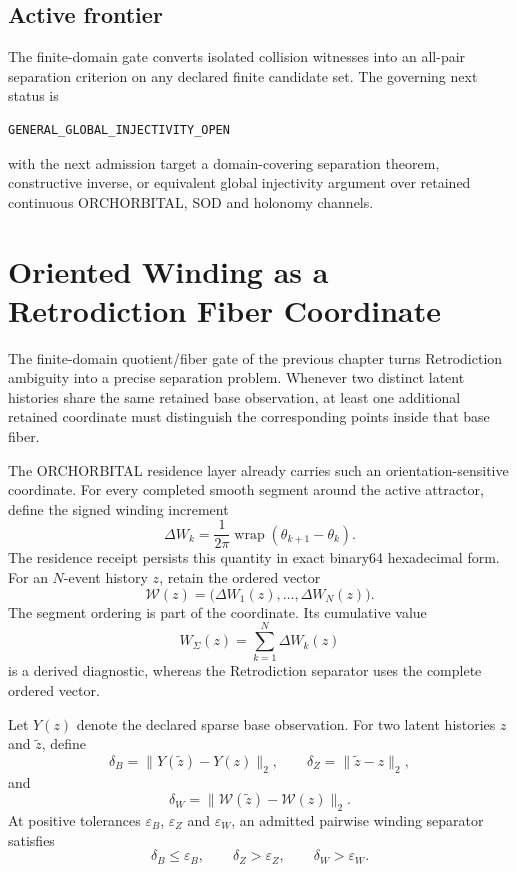 \section{Active frontier}

The finite-domain gate converts isolated collision witnesses into an all-pair separation criterion on any declared finite candidate set.  The governing next status is
\begin{verbatim}
GENERAL_GLOBAL_INJECTIVITY_OPEN
\end{verbatim}
with the next admission target a domain-covering separation theorem, constructive inverse, or equivalent global injectivity argument over retained continuous ORCHORBITAL, SOD and holonomy channels.


\chapter{Oriented Winding as a Retrodiction Fiber Coordinate}
\label{chap:oriented-winding-fiber}

The finite-domain quotient/fiber gate of the previous chapter turns Retrodiction ambiguity into a precise separation problem.  Whenever two distinct latent histories share the same retained base observation, at least one additional retained coordinate must distinguish the corresponding points inside that base fiber.

The ORCHORBITAL residence layer already carries such an orientation-sensitive coordinate.  For every completed smooth segment around the active attractor, define the signed winding increment
\[
\Delta W_k
=\frac{1}{2\pi}\operatorname{wrap}(\theta_{k+1}-\theta_k).
\]
The residence receipt persists this quantity in exact binary64 hexadecimal form.  For an $N$-event history $z$, retain the ordered vector
\[
\boxed{
\mathcal W(z)
=\bigl(\Delta W_1(z),\ldots,\Delta W_N(z)\bigr).
}
\]
The segment ordering is part of the coordinate.  Its cumulative value
\[
W_{\Sigma}(z)=\sum_{k=1}^{N}\Delta W_k(z)
\]
is a derived diagnostic, whereas the Retrodiction separator uses the complete ordered vector.

Let $Y(z)$ denote the declared sparse base observation.  For two latent histories $z$ and $\widetilde z$, define
\[
\delta_B=\|Y(\widetilde z)-Y(z)\|_2,
\qquad
\delta_Z=\|\widetilde z-z\|_2,
\]
and
\[
\boxed{
\delta_W
=\|\mathcal W(\widetilde z)-\mathcal W(z)\|_2.
}
\]
At positive tolerances $\varepsilon_B$, $\varepsilon_Z$ and $\varepsilon_W$, an admitted pairwise winding separator satisfies
\[
\delta_B\le\varepsilon_B,
\qquad
\delta_Z>\varepsilon_Z,
\qquad
\delta_W>\varepsilon_W.
\]

